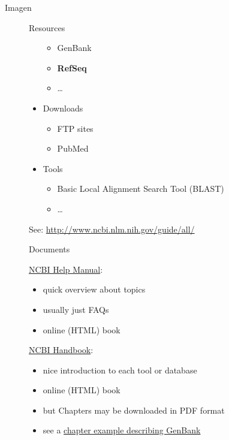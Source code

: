 \begin{frame}{Imagen}
\begin{figure}[htbp]
\begin{frame}{Resources}
\begin{itemize}
  \begin{itemize}
  \itemsep1pt\parskip0pt
  \item
    GenBank
  \item
    \textbf{RefSeq}
  \item
    \ldots{}
  \end{itemize}
\item
  Downloads

  \begin{itemize}
  \itemsep1pt\parskip0pt
  \item
    FTP sites
  \item
    PubMed
  \end{itemize}
\item
  Tools

  \begin{itemize}
  \itemsep1pt\parskip0pt
  \item
    Basic Local Alignment Search Tool (BLAST)
  \item
    \ldots{}
  \end{itemize}
\end{itemize}

See: \url{http://www.ncbi.nlm.nih.gov/guide/all/}

\end{frame}

\begin{frame}{Documents}

\href{http://www.ncbi.nlm.nih.gov/books/NBK3831/}{NCBI Help Manual}:

\begin{itemize}
\itemsep1pt\parskip0pt
\item
  quick overview about topics
\item
  usually just FAQs
\item
  online (HTML) book
\end{itemize}

\href{http://www.ncbi.nlm.nih.gov/books/NBK21101/}{NCBI Handbook}:

\begin{itemize}
\itemsep1pt\parskip0pt
\item
  nice introduction to each tool or database
\item
  online (HTML) book
\item
  but Chapters may be downloaded in PDF format
\item
  see a \href{http://www.ncbi.nlm.nih.gov/books/NBK21105/}{chapter
  example describing GenBank}
\end{itemize}


\end{frame}
\end{figure}
\end{frame}
